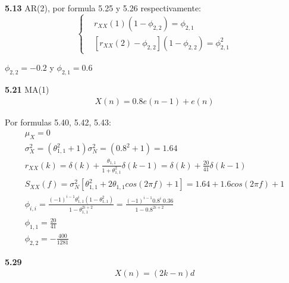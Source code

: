 \vspace{1cm}

\textbf{5.13} AR(2), por formula 5.25 y 5.26 respectivamente:
\begin{equation*}
\left\lbrace
\begin{split}
	& r_{XX}(1) \left( 1 - \phi_{2,2} \right) = \phi_{2,1}	\\
	& \left[ r_{XX}(2) - \phi_{2,2} \right] \left( 1 - \phi_{2,2} \right) = \phi_{2,1}^2
\end{split}
\right.
\end{equation*}

$\phi_{2,2} = -0.2$ y $\phi_{2,1} = 0.6$

\vspace{1cm}

\textbf{5.21} MA(1)
\begin{equation*}
\begin{split}
	X(n) = 0.8e(n-1) + e(n)
\end{split}
\end{equation*}

Por formulas 5.40, 5.42, 5.43:
\begin{equation*}
\begin{gathered}
	\mu_X = 0	\\
	\sigma_X^2 = (\theta_{1,1}^2 + 1) \sigma_{N}^2 = (0.8^2 + 1) = 1.64		\\
	r_{XX}(k) = \delta(k) + \frac{\theta_{1,1}}{1 + \theta_{1,1}^2} \delta(k-1) = \delta(k) + \frac{20}{41} \delta(k-1)	\\
	S_{XX}(f) = \sigma_N^2 \left[ \theta_{1,1}^2 + 2 \theta_{1,1} cos(2 \pi f) + 1 \right] = 1.64 + 1.6 cos(2 \pi f) + 1	\\
	\phi_{i,i} = \frac{\left(-1\right)^{i-1} \theta_{1,1}^i \left(1 - \theta_{1,1}^2 \right)}{1 - \theta_{1,1}^{2i + 2}} = \frac{\left(-1\right)^{i-1} 0.8^i \ 0.36}{1 - 0.8^{2i + 2}} \\
	\phi_{1,1} = \frac{20}{41} \\
	\phi_{2,2} = -\frac{400}{1281}
\end{gathered}
\end{equation*}

\vspace{1cm}

\textbf{5.29}
\begin{equation*}
\begin{split}
	X(n) = (2k - n)d 
\end{split}
\end{equation*}

